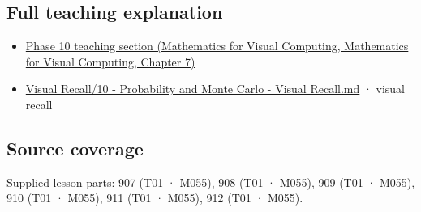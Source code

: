 \subsection{Full teaching explanation}\label{appendix-4d0203f7944f-full-teaching-explanation}

\begin{itemize}
\tightlist
\item
  \href{../02-Mathematics-for-Visual-Computing/main.pdf\#nameddest=02-foundations-ii-ch023-random-quantities-and-their-probability-laws}{Phase 10 teaching section (Mathematics for Visual Computing, Mathematics for Visual Computing, Chapter 7)}
\item
  \hyperref[appendix-cb5af353ef77]{Visual Recall/10 - Probability and Monte Carlo - Visual Recall.md} · visual recall
\end{itemize}

\subsection{Source coverage}\label{appendix-4d0203f7944f-source-coverage}

Supplied lesson parts: 907 (T01 · M055), 908 (T01 · M055), 909 (T01 · M055), 910 (T01 · M055), 911 (T01 · M055), 912 (T01 · M055).
